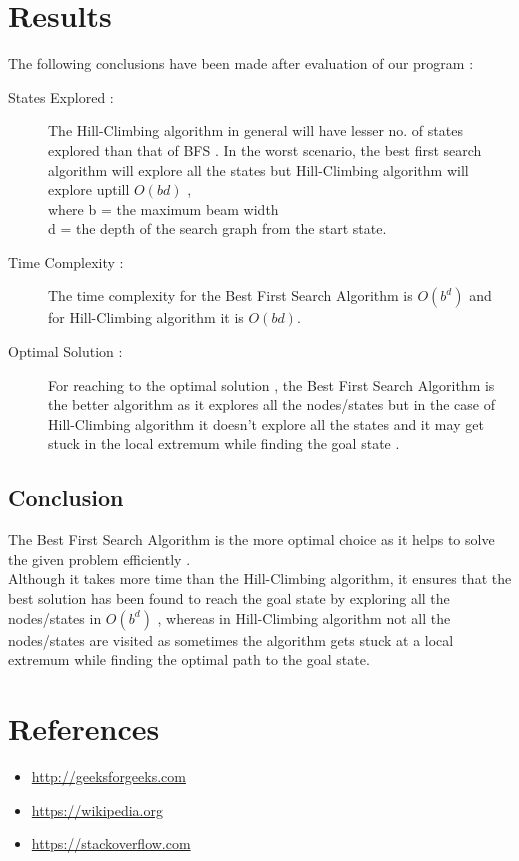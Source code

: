 \documentclass{article}
\begin{document}
\section{Results}
\vspace{20pt}
The following conclusions have been made after evaluation of our program :
\begin{description}
    \item[States Explored :]The Hill-Climbing algorithm in general will have lesser no. of states explored than that of BFS .
    In the worst scenario, the best first search algorithm will explore all the states but Hill-Climbing algorithm will explore uptill $O(bd)$ 
    ,\\ where b = the maximum beam width 
    \\\hspace*{29pt}d = the depth of the search graph from the start state.
    \item[Time Complexity :] The time complexity for the Best First Search Algorithm is $O(b^d)$ and for Hill-Climbing algorithm it is $O(bd)$.
    \item[Optimal Solution :] For reaching to the optimal solution , the Best First Search Algorithm is the better algorithm as it explores all the nodes/states
    but in the case of Hill-Climbing algorithm it doesn't explore all the states and it may get stuck in the local extremum while finding the goal state . 
\end{description}
\vspace{20pt}
\subsection*{Conclusion}
The Best First Search Algorithm is the more optimal choice as it helps to solve the given problem
efficiently . 
\vspace{5pt}
\\Although it takes more time than the Hill-Climbing algorithm, it ensures that the best solution
has been found to reach the goal state by exploring all the nodes/states in $O(b^d)$ , whereas in Hill-Climbing algorithm
not all the nodes/states are visited as sometimes the algorithm gets stuck at a local extremum while finding the optimal path to the goal state.
\newpage
\section{References}
\vspace{30pt}
\begin{itemize}
    \item \url{http://geeksforgeeks.com}
    \item \url{https://wikipedia.org}
    \item \url{https://stackoverflow.com}
\end{itemize}
\end{document}
